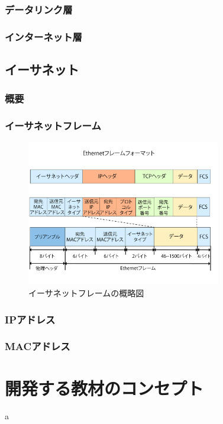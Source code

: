 \documentclass[12pt,a4j,titlepage]{ltjsarticle}
\begin{document}
\subsubsection{データリンク層}
\subsubsection{インターネット層}

\subsection{イーサネット}
\subsubsection{概要}
\subsubsection{イーサネットフレーム}
\begin{figure}[h]
\centering
\includegraphics[clip,width=85mm]{figures/ethernet.pdf}
\caption[イーサネットフレームの概略図]{イーサネットフレームの概略図\linebreak}
\label{fig:ether}
\end{figure}

\subsubsection{IPアドレス}
\subsubsection{MACアドレス}

\clearpage

\section{開発する教材のコンセプト}%
a
\end{document}
